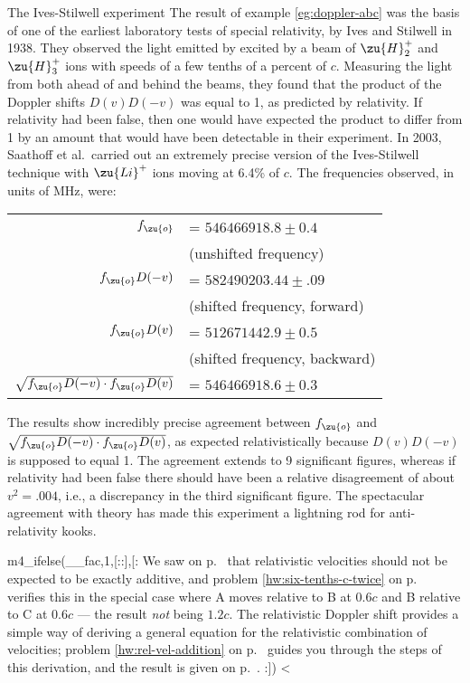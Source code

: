 \begin{eg}{The Ives-Stilwell experiment}
The result of example \ref{eg:doppler-abc} was the basis of one of the earliest laboratory tests of special relativity, by Ives and Stilwell in 1938.
They observed the light emitted by excited by a beam of $\zu{H}_2^+$ and $\zu{H}_3^+$ ions with speeds of a few tenths of a percent of $c$.
Measuring the light from both ahead of and behind the beams, they found that the product of the Doppler shifts $D(v)D(-v)$ was equal to 1,
as predicted by relativity. If relativity had been false, then one would have expected the product to differ from 1 by an amount that would
have been detectable in their experiment. In 2003, Saathoff et al.~carried out an extremely precise version of the Ives-Stilwell technique
with $\zu{Li}^+$ ions moving at 6.4\% of $c$. The frequencies observed, in units of MHz, were:

\noindent\begin{tabular}{rl}
$f_\zu{o}$ &=      $546466918.8  \pm 0.4$ \\
           & \hfill (unshifted frequency)\\
$f_\zu{o}D(-v)$ & =          $582490203.44 \pm .09$ \\
           & \hfill (shifted frequency, forward)\\
$f_\zu{o} D(v)$ & =          $512671442.9  \pm 0.5$ \\
           & \hfill (shifted frequency, backward)\\
$\sqrt{f_\zu{o}D(-v)\cdot f_\zu{o} D(v)}$ &= $546466918.6  \pm 0.3$ 
\end{tabular}

\noindent The results show incredibly precise agreement between $f_\zu{o}$ and $\sqrt{f_\zu{o}D(-v)\cdot f_\zu{o} D(v)}$, as expected
relativistically because $D(v)D(-v)$ is supposed to equal 1. The agreement extends to 9 significant figures, whereas
if relativity had been false there should have been a relative disagreement of about $v^2=.004$, i.e., a discrepancy in the third significant figure.
The spectacular agreement with theory has made this experiment a lightning rod for
anti-relativity kooks.
\end{eg}

m4_ifelse(__fac,1,[::],[:%
We saw on p.~\pageref{relativistic-combination-of-vel} that relativistic velocities should not be expected to be exactly additive,
and problem \ref{hw:six-tenths-c-twice} on p.~\pageref{hw:six-tenths-c-twice} verifies this in the special case where A moves relative to B
at $0.6c$ and B relative to C at $0.6c$ --- the result \emph{not} being $1.2c$.
The relativistic Doppler shift provides a simple way of deriving a general equation for the relativistic combination 
of velocities;
problem \ref{hw:rel-vel-addition} on p.~\pageref{hw:rel-vel-addition} guides you through the steps of this derivation,
and the result is given on p.~\pageref{soln:rel-vel-addition}.
:])
<%
